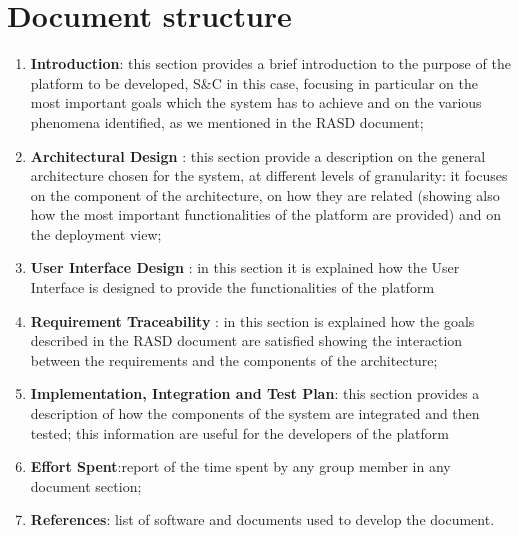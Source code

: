 	\section{Document structure}
		\begin{enumerate}
			\item \textbf{Introduction}: this section provides a brief introduction to the purpose of the platform to be developed, S\&C in this case, focusing in particular on the most important goals which the system has to achieve and on the various phenomena identified, as we mentioned in the RASD document;
			\item \textbf{Architectural Design} : this section provide a description on the general architecture chosen for the system, at different levels of granularity: it focuses on the component of the architecture, on how they are related (showing also how the most important functionalities of the platform are provided) and on the deployment view;
			\item \textbf{User Interface Design} : in this section it is explained how the User Interface is designed to provide the functionalities of the platform
			\item \textbf{Requirement Traceability} : in this section is explained how the goals described in the RASD document are satisfied showing the interaction between the requirements and the components of the architecture;
			\item \textbf{Implementation, Integration and Test Plan}: this section provides a description of how the components of the system are integrated and then tested; this information are useful for the developers of the platform
			\item \textbf{Effort Spent}:report of the time spent by any group member in any document section;
			\item \textbf{References}: list of software and documents used to develop the document.
		\end{enumerate}